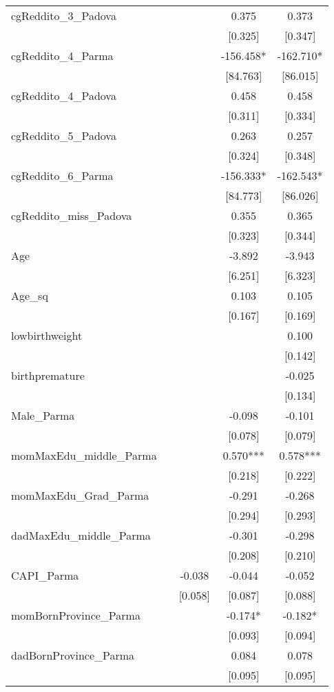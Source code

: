 \documentclass[]{article}
\begin{document}
\begin{tabular}{lcccc}
cgReddito\_3\_Padova &  &  & 0.375 & 0.373 \\
 &  &  & [0.325] & [0.347] \\
cgReddito\_4\_Parma &  &  & -156.458* & -162.710* \\
 &  &  & [84.763] & [86.015] \\
cgReddito\_4\_Padova &  &  & 0.458 & 0.458 \\
 &  &  & [0.311] & [0.334] \\
cgReddito\_5\_Padova &  &  & 0.263 & 0.257 \\
 &  &  & [0.324] & [0.348] \\
cgReddito\_6\_Parma &  &  & -156.333* & -162.543* \\
 &  &  & [84.773] & [86.026] \\
cgReddito\_miss\_Padova &  &  & 0.355 & 0.365 \\
 &  &  & [0.323] & [0.344] \\
Age &  &  & -3.892 & -3.943 \\
 &  &  & [6.251] & [6.323] \\
Age\_sq &  &  & 0.103 & 0.105 \\
 &  &  & [0.167] & [0.169] \\
lowbirthweight &  &  &  & 0.100 \\
 &  &  &  & [0.142] \\
birthpremature &  &  &  & -0.025 \\
 &  &  &  & [0.134] \\
Male\_Parma &  &  & -0.098 & -0.101 \\
 &  &  & [0.078] & [0.079] \\
momMaxEdu\_middle\_Parma &  &  & 0.570*** & 0.578*** \\
 &  &  & [0.218] & [0.222] \\
momMaxEdu\_Grad\_Parma &  &  & -0.291 & -0.268 \\
 &  &  & [0.294] & [0.293] \\
dadMaxEdu\_middle\_Parma &  &  & -0.301 & -0.298 \\
 &  &  & [0.208] & [0.210] \\
CAPI\_Parma &  & -0.038 & -0.044 & -0.052 \\
 &  & [0.058] & [0.087] & [0.088] \\
momBornProvince\_Parma &  &  & -0.174* & -0.182* \\
 &  &  & [0.093] & [0.094] \\
dadBornProvince\_Parma &  &  & 0.084 & 0.078 \\
 &  &  & [0.095] & [0.095] \\

\end{tabular}
\end{document}
